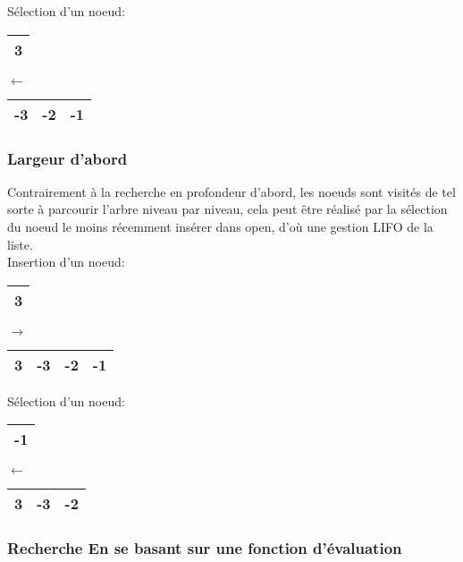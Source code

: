 Sélection d'un noeud:\\
\begin{minipage}{0.5\textwidth}
	\centering
	\begin{tabular}{|c |}
		\hline
		{\color{red}3} \\
		\hline
	\end{tabular}
\end{minipage}
\hfillx
$\leftarrow$
\begin{minipage}{0.5\textwidth}
	\centering
	\begin{tabular}{| c| c| c|}
		\hline
		-3 & -2 & -1 \\\hline
	\end{tabular}
\end{minipage}


\subsubsection{Largeur d'abord}
Contrairement à la recherche en profondeur d’abord, les noeuds sont visités de tel sorte à parcourir l’arbre niveau par niveau, cela peut être réalisé par la sélection du noeud le moins récemment insérer dans open, d’où une gestion LIFO de la liste.\\
Insertion d'un noeud:\\
\begin{minipage}{0.5\textwidth}
	\centering
	\begin{tabular}{|c |}
		\hline
		3 \\
		\hline
	\end{tabular}
\end{minipage}
\hfillx
$\rightarrow$
\begin{minipage}{0.5\textwidth}
	\centering
	\begin{tabular}{|c | c| c| c|}
		\hline
		{\color{red}3} & -3 & -2 & -1 \\\hline
	\end{tabular}
\end{minipage}

Sélection d'un noeud:\\
\begin{minipage}{0.5\textwidth}
	\centering
	\begin{tabular}{|c |}
		\hline
		{\color{red}-1} \\
		\hline
	\end{tabular}
\end{minipage}
\hfillx
$\leftarrow$
\begin{minipage}{0.5\textwidth}
	\centering
	\begin{tabular}{| c| c| c|}
		\hline
		3 & -3 & -2  \\\hline
	\end{tabular}
\end{minipage}

\subsubsection{Recherche En se basant sur une fonction d'évaluation}



